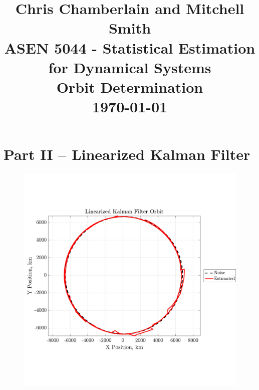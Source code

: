 \documentclass[a4paper]{aiaa-tc}
\title{Chris Chamberlain and Mitchell Smith \\ ASEN 5044 - Statistical Estimation for Dynamical Systems \\ Orbit Determination \\ \today}
\begin{document}
    \maketitle

\section*{Part II -- Linearized Kalman Filter}
 \begin{figure}[H]
 \centering
 \includegraphics[width=\textwidth]{Figures/LKF_orbit.pdf}
 \end{figure}
 
\end{document}
